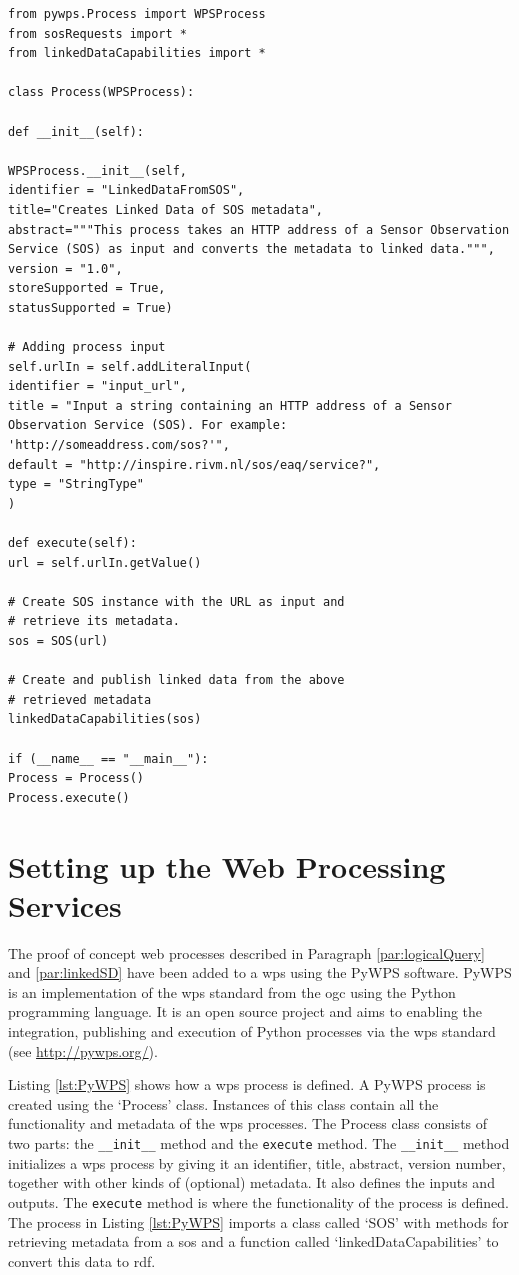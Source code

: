 \begin{lstlisting}[float,caption={Script that defines a web proces using PyWPS}, label={lst:PyWPS}]
from pywps.Process import WPSProcess
from sosRequests import *
from linkedDataCapabilities import *

class Process(WPSProcess):

def __init__(self):

WPSProcess.__init__(self,
identifier = "LinkedDataFromSOS",
title="Creates Linked Data of SOS metadata",
abstract="""This process takes an HTTP address of a Sensor Observation Service (SOS) as input and converts the metadata to linked data.""",
version = "1.0",
storeSupported = True,
statusSupported = True)

# Adding process input
self.urlIn = self.addLiteralInput(
identifier = "input_url", 
title = "Input a string containing an HTTP address of a Sensor Observation Service (SOS). For example: 'http://someaddress.com/sos?'", 
default = "http://inspire.rivm.nl/sos/eaq/service?", 
type = "StringType"
)

def execute(self):
url = self.urlIn.getValue()

# Create SOS instance with the URL as input and 
# retrieve its metadata.  
sos = SOS(url)

# Create and publish linked data from the above 
# retrieved metadata
linkedDataCapabilities(sos)

if (__name__ == "__main__"):
Process = Process()
Process.execute()
\end{lstlisting}

\section{Setting up the Web Processing Services}
\label{impl:wps}

The proof of concept web processes described in Paragraph \ref{par:logicalQuery} and \ref{par:linkedSD} have been added to a \ac{wps} using the PyWPS software. PyWPS is an implementation of the \acl{wps} standard from the \acl{ogc} using the Python programming language. It is an open source project and aims to enabling the integration, publishing and execution of Python processes via the \ac{wps} standard (see \url{http://pywps.org/}).  

Listing \ref{lst:PyWPS} shows how a \ac{wps} process is defined. A PyWPS process is created using the `Process' class.   Instances of this class contain all the functionality and metadata of the \ac{wps} processes. The Process class consists of two parts: the \texttt{\_\_init\_\_} method and the \texttt{execute} method. The \texttt{\_\_init\_\_} method initializes a \ac{wps} process by giving it an identifier, title, abstract, version number, together with other kinds of (optional) metadata. It also defines the inputs and outputs. The \texttt{execute} method is where the functionality of the process is defined. The process in Listing \ref{lst:PyWPS} imports a class called `SOS' with methods for retrieving metadata from a \acl{sos} and a function called `linkedDataCapabilities' to convert this data to \ac{rdf}.

